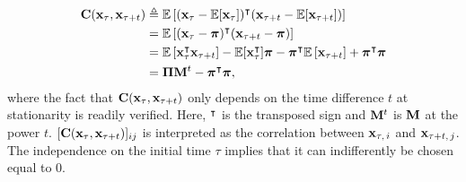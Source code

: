 \begin{align}
 	\mathbf C(\mathbf x_\tau,\mathbf x_{\tau+t}) &\triangleq \mathbb{E}\left[(\mathbf x_\tau - \mathbb{E}[\mathbf x_\tau])^{\intercal}(\mathbf x_{\tau+t} - \mathbb{E}[\mathbf x_{\tau+t}])\right] \\
 		&= \mathbb{E}\left[(\mathbf x_\tau - \boldsymbol \pi)^{\intercal}(\mathbf x_{\tau+t} - \boldsymbol \pi)\right] \\
 		&= \mathbb{E}\left[\mathbf x_\tau^{\intercal} \mathbf x_{\tau+t}\right] - \mathbb{E}[\mathbf x_{\tau}^{\intercal}] \boldsymbol \pi - \boldsymbol \pi^{\intercal} \mathbb{E}\left[\mathbf x_{\tau+t}\right] + \boldsymbol \pi^{\intercal} \boldsymbol \pi \\
 		&= \boldsymbol \Pi \mathbf M^t - \boldsymbol \pi^{\intercal} \boldsymbol \pi,
 \end{align}
 where the fact that $\mathbf C(\mathbf x_\tau,\mathbf x_{\tau+t})$ only depends on the time difference $t$ at stationarity is readily verified. Here, $^\intercal$ is the transposed sign and $\mathbf M^t$ is $\mathbf M$ at the power $t$. $[\mathbf C(\mathbf x_\tau,\mathbf x_{\tau+t})]_{ij}$ is interpreted as the correlation between $\mathbf x_{\tau,\,i}$ and $\mathbf x_{\tau+t,\,j}$. The independence on the initial time $\tau$ implies that it can indifferently be chosen equal to $0$.

